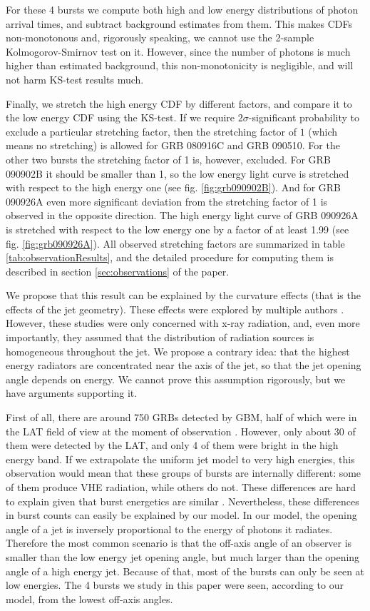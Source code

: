 \documentclass{article}
\begin{document}
	For these 4 bursts we compute both high and low energy distributions of photon arrival times, and subtract background estimates from them.
	This makes CDFs non-monotonous and, rigorously speaking, we cannot use the 2-sample Kolmogorov-Smirnov test on it.
	However, since the number of photons is much higher than estimated background, this non-monotonicity is negligible, and will not harm KS-test results much.

	Finally, we stretch the high energy CDF by different factors, and compare it to the low energy CDF using the KS-test.
	If we require $2\sigma$-significant probability to exclude a particular stretching factor, then the stretching factor of $1$ (which means no stretching) is allowed for GRB 080916C and GRB 090510.
	For the other two bursts the stretching factor of 1 is, however, excluded.
	For GRB 090902B it should be smaller than 1, so the low energy light curve is stretched with respect to the high energy one (see fig. \ref{fig:grb090902B}).
	And for GRB 090926A even more significant deviation from the stretching factor of 1 is observed in the opposite direction.
	The high energy light curve of GRB 090926A is stretched with respect to the low energy one by a factor of at least 1.99 (see fig. \ref{fig:grb090926A}).
	All observed stretching factors are summarized in table \ref{tab:observationResults}, and the detailed procedure for computing them is described in section \ref{sec:observations} of the paper.

	We propose that this result can be explained by the curvature effects (that is the effects of the jet geometry).
	These effects were explored by multiple authors \cite{Nakamura:2001kd,Shen:2005ea,Shenoy:2013cba}.
	However, these studies were only concerned with x-ray radiation, and, even more importantly, they assumed that the distribution of radiation sources is homogeneous throughout the jet.
	We propose a contrary idea: that the highest energy radiators are concentrated near the axis of the jet, so that the jet opening angle depends on energy.
	We cannot prove this assumption rigorously, but we have arguments supporting it.

	First of all, there are around 750 GRBs detected by GBM, half of which were in the LAT field of view at the moment of observation \cite{Vianello:2013ela}.
	However, only about 30 of them were detected by the LAT, and only 4 of them were bright in the high energy band.
	If we extrapolate the uniform jet model to very high energies, this observation would mean that these groups of bursts are internally different: some of them produce VHE radiation, while others do not.
	These differences are hard to explain given that burst energetics are similar \cite{Bloom:2003wy}.
	Nevertheless, these differences in burst counts can easily be explained by our model.
	In our model, the opening angle of a jet is inversely proportional to the energy of photons it radiates.
	Therefore the most common scenario is that the off-axis angle of an observer is smaller than the low energy jet opening angle, but much larger than the opening angle of a high energy jet.
	Because of that, most of the bursts can only be seen at low energies.
	The 4 bursts we study in this paper were seen, according to our model, from the lowest off-axis angles.
\end{document}
